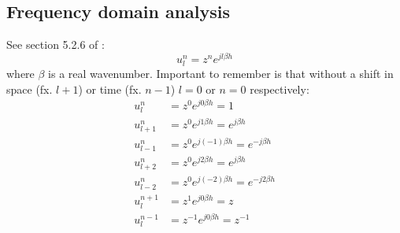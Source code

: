 \documentclass{article}
\begin{document}
\subsection{Frequency domain analysis}
See section 5.2.6 of \cite{Bilbao2009}:
\begin{equation}
    u_l^n = z^n e^{jl\beta h}
\end{equation}
where $\beta$ is a real wavenumber. Important to remember is that without a shift in space (fx. $l+1$) or time (fx. $n-1$) $l = 0$ or $n=0$ respectively:
\begin{subequations} \label{eq:identitiesZ}
    \begin{align}
        u_l^n &= z^0 e^{j0\beta h} = 1\\
        u_{l+1}^n &= z^0 e^{j1\beta h} = e^{j\beta h}\\
        u_{l-1}^n &= z^0 e^{j(-1)\beta h} = e^{-j\beta h}\\
        u_{l+2}^n &= z^0 e^{j2\beta h} = e^{j\beta h}\\
        u_{l-2}^n &= z^0 e^{j(-2)\beta h}= e^{-j2\beta h}\\
        u_l^{n+1}&= z^1 e^{j0\beta h} = z\\
        u_l^{n-1}&= z^{-1} e^{j0\beta h} = z^{-1}
    \end{align}
\end{subequations}
\end{document}
